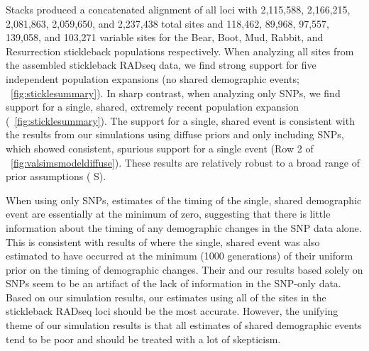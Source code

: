 Stacks produced a concatenated alignment of all loci with
2,115,588,
2,166,215,
2,081,863,
2,059,650, and
2,237,438
total sites and
118,462,
89,968,
97,557,
139,058, and
103,271
variable sites for the Bear, Boot, Mud, Rabbit, and Resurrection
stickleback populations respectively.
When analyzing all sites from the assembled stickleback
RADseq data, we find strong support for five independent
population expansions (no shared demographic events;
\fig{}~\ref{fig:sticklesummary}).
In sharp contrast, when analyzing only SNPs, we find
support for a single, shared, extremely recent population expansion
(\fig{}~\ref{fig:sticklesummary}).
The support for a single, shared event is consistent with the results from our
simulations using diffuse priors and only including SNPs, which showed
consistent, spurious support for a single event
(Row 2 of \fig{}~\ref{fig:valsimsmodeldiffuse}).
These results are relatively robust to a broad range of prior
assumptions
(\figs
S).

\ifembed{

}{}

When using only SNPs, estimates of the timing of the single, shared demographic
event are essentially at the minimum of zero, suggesting that there is little
information about the timing of any demographic changes in the SNP data alone.
This is consistent with results of \citet{Xue2015} where the single, shared
event was also estimated to have occurred at the minimum (1000 generations) of
their uniform prior on the timing of demographic changes.
Their and our results based solely on SNPs seem to be an artifact of the lack
of information in the SNP-only data.
Based on our simulation results, our estimates using all of the sites
in the stickleback RADseq loci should be the most accurate.
However, the unifying theme of our simulation results is that all estimates of
shared demographic events tend to be poor and should be treated with
a lot of skepticism.
